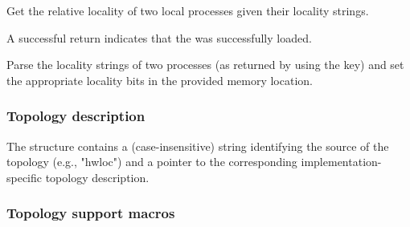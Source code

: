 Get the relative locality of two local processes given their locality strings.

\format


\begin{arglist}
\end{arglist}

A successful return indicates that the  was successfully loaded.

\returnsimple

\descr

Parse the locality strings of two processes (as returned by  using the  key) and set the appropriate  locality bits in the provided memory location.

\subsubsection{Topology description}

The  structure contains a (case-insensitive)
string identifying the source of the topology (e.g., "hwloc") and a pointer
to the corresponding implementation-specific topology description.


\subsubsection{Topology support macros}

